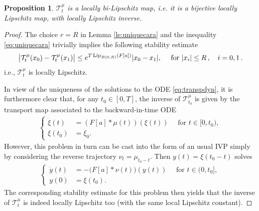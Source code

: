 \documentclass[A4paper,11pt]{article}
\newtheorem{proposition}[theorem]{Proposition}
\theoremstyle{definition}
\newcommand{\Lip}{\textup{Lip}}
\newcommand{\ct}{\mathcal{T}}
\begin{document}
\begin{proposition}\label{p-transportlip}
$\ct^\mu_t$ is a locally bi-Lipschitz map, i.e. it is a bijective locally Lipschitz map, with locally Lipschitz inverse.
\end{proposition}
\begin{proof}
	
 The choice $r = R$ in Lemma \ref{le:uniquecara} and the inequality \eqref{eq:uniquecara} trivially implies the following stability estimate
	\begin{align}\label{eq:liptrans}
		\bigl|\ct^\mu_t(x_0)-\ct^\mu_t(x_1)\bigr|
			\leq e^{T\,\Lip_{B(0,R)}(F[a])}|x_0-x_1|,\quad \text{ for } |x_i|\leq R\,,\quad i=0,1\,.
	\end{align}
	i.e., $\ct^\mu_t$ is locally Lipschitz.
	
	In view of the uniqueness of the solutions to the ODE \eqref{eq:transpdyn}, it is furthermore clear that, for any $t_0\in [0,T]$, the inverse of $\ct^\mu_{t_0}$ is
	given by the transport map associated to the backward-in-time ODE
\begin{align*}
\left\{\begin{aligned}
\dot{\xi}(t) &= (F[a]*\mu(t))(\xi(t)) \quad \text{ for } t \in [0,t_0),\\
\xi(t_0) &= \xi_0.
\end{aligned}\right.
\end{align*}
	However, this problem in turn can be cast into the form of an usual IVP simply by considering the reverse trajectory $\nu_t=\mu_{t_0-t}$. Then
	$y(t)=\xi(t_0-t)$ solves
	\begin{align*}
	\left\{\begin{aligned}
		\dot y(t)&=-\bigl(F[a]\ast\nu(t)\bigr)(y(t))  \quad \text{ for } t \in (0,t_0], \\
		y(0) &= \xi(t_0).
	\end{aligned}\right.
	\end{align*}
	The corresponding stability estimate for this problem then yields that the inverse of $\ct^\mu_t$ is indeed
	locally Lipschitz too (with the same local Lipschitz constant).
\end{proof}
\end{document}
